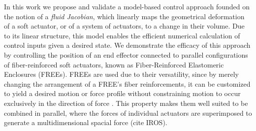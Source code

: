 In this work we propose and validate a model-based control approach founded on the notion of a \emph{fluid Jacobian}, which linearly maps the geometrical deformation of a soft actuator, or of a system of actuators, to a change in their volume. 
Due to its linear structure, this model enables the efficient numerical calculation of control inputs given a desired state.
We demonstrate the efficacy of this approach by controlling the position of an end effector connected to parallel configurations of fiber-reinforced soft actuators, known as Fiber-Reinforced Elastomeric Enclosures (FREEs). 
FREEs are used due to their versatility, %
since by merely changing the arrangement of a FREE's fiber reinforcements, it can be customized to yield a desired motion or force profile without constraining motion to occur exclusively in the direction of force \cite{bishop2015design, connolly2015mechanical, felt2018closed, krishnan2015kinematics, bishop2013force, bruder2017model, sedal2017constitutive}. This property makes them well suited to be combined in parallel, where the forces of individual actuators are superimposed to generate a multidimensional spacial force (cite IROS). 



















